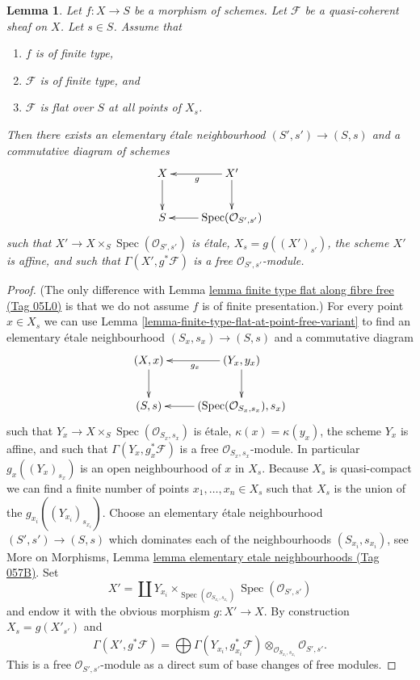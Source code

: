 \documentclass{amsart}
\theoremstyle{plain}
\newtheorem{lemma}[subsection]{Lemma}
\theoremstyle{definition}
\theoremstyle{remark}
\numberwithin{equation}{subsection}
\def\Spec{\mathop{\mathrm{Spec}}}
\begin{document}
\begin{lemma}
\label{lemma-finite-type-flat-along-fibre-free-variant}
Let $f : X \to S$ be a morphism of schemes.
Let $\mathcal{F}$ be a quasi-coherent sheaf on $X$.
Let $s \in S$.
Assume that
\begin{enumerate}
\item $f$ is of finite type,
\item $\mathcal{F}$ is of finite type, and
\item $\mathcal{F}$ is flat over $S$ at all points of $X_s$.
\end{enumerate}
Then there exists an elementary \'etale neighbourhood $(S', s') \to (S, s)$
and a commutative diagram of schemes
$$
\xymatrix{
X \ar[d] & X' \ar[l]^g \ar[d] \\
S & \Spec(\mathcal{O}_{S', s'}) \ar[l]
}
$$
such that $X' \to X \times_S \Spec(\mathcal{O}_{S', s'})$
is \'etale, $X_s = g((X')_{s'})$, the scheme $X'$ is affine,
and such that $\Gamma(X', g^*\mathcal{F})$ is a free
$\mathcal{O}_{S', s'}$-module.
\end{lemma}

\begin{proof}
(The only difference with
Lemma \href{https://stacks.math.columbia.edu/tag/05L0}{lemma finite type flat along fibre free (Tag 05L0)}
is that we do not assume $f$ is of finite presentation.)
For every point $x \in X_s$ we can use
Lemma \ref{lemma-finite-type-flat-at-point-free-variant}
to find an elementary \'etale neighbourhood $(S_x , s_x) \to (S, s)$
and a commutative diagram
$$
\xymatrix{
(X, x) \ar[d] & (Y_x, y_x) \ar[l]^{g_x} \ar[d] \\
(S, s) & (\Spec(\mathcal{O}_{S_x, s_x}), s_x) \ar[l]
}
$$
such that $Y_x \to X \times_S \Spec(\mathcal{O}_{S_x, s_x})$
is \'etale, $\kappa(x) = \kappa(y_x)$, the scheme $Y_x$ is affine, and
such that $\Gamma(Y_x, g_x^*\mathcal{F})$ is a free
$\mathcal{O}_{S_x, s_x}$-module. In particular
$g_x((Y_x)_{s_x})$ is an open neighbourhood of $x$ in $X_s$.
Because $X_s$ is quasi-compact we can find a finite number of points
$x_1, \ldots, x_n \in X_s$ such that $X_s$ is the union of
the $g_{x_i}((Y_{x_i})_{s_{x_i}})$. Choose an elementary \'etale neighbourhood
$(S' , s') \to (S, s)$ which dominates each of the neighbourhoods
$(S_{x_i}, s_{x_i})$, see
More on Morphisms,
Lemma \href{https://stacks.math.columbia.edu/tag/057B}{lemma elementary etale neighbourhoods (Tag 057B)}.
Set
$$
X' = \coprod Y_{x_i} \times_{\Spec(\mathcal{O}_{S_{x_i}, s_{x_i}})}
\Spec(\mathcal{O}_{S', s'})
$$
and endow it with the obvious morphism $g : X' \to X$.
By construction $X_s = g(X'_{s'})$ and
$$
\Gamma(X', g^*\mathcal{F})
=
\bigoplus \Gamma(Y_{x_i}, g_{x_i}^*\mathcal{F})
\otimes_{\mathcal{O}_{S_{x_i}, s_{x_i}}}
\mathcal{O}_{S', s'}.
$$
This is a free $\mathcal{O}_{S', s'}$-module as a direct sum
of base changes of free modules.
\end{proof}
\end{document}
